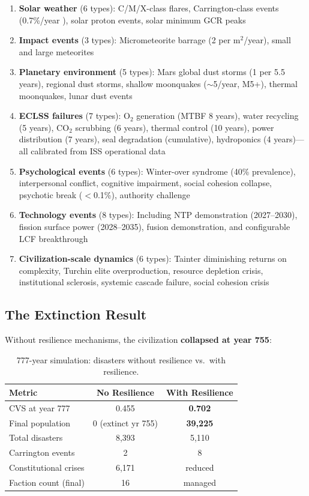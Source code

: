 \documentclass[12pt,a4paper]{article}
\begin{document}
\begin{enumerate}
    \item \textbf{Solar weather} (6 types): C/M/X-class flares, Carrington-class events (0.7\%/year \citep{riley2012probability}), solar proton events, solar minimum GCR peaks
    \item \textbf{Impact events} (3 types): Micrometeorite barrage (2 per m$^2$/year), small and large meteorites
    \item \textbf{Planetary environment} (5 types): Mars global dust storms (1 per 5.5 years), regional dust storms, shallow moonquakes ($\sim$5/year, M5+), thermal moonquakes, lunar dust events
    \item \textbf{ECLSS failures} (7 types): O$_2$ generation (MTBF 8 years), water recycling (5 years), CO$_2$ scrubbing (6 years), thermal control (10 years), power distribution (7 years), seal degradation (cumulative), hydroponics (4 years)---all calibrated from ISS operational data
    \item \textbf{Psychological events} (6 types): Winter-over syndrome (40\% prevalence), interpersonal conflict, cognitive impairment, social cohesion collapse, psychotic break ($<$0.1\%), authority challenge
    \item \textbf{Technology events} (8 types): Including NTP demonstration (2027--2030), fission surface power (2028--2035), fusion demonstration, and configurable LCF breakthrough
    \item \textbf{Civilization-scale dynamics} (6 types): Tainter diminishing returns on complexity, Turchin elite overproduction, resource depletion crisis, institutional sclerosis, systemic cascade failure, social cohesion crisis
\end{enumerate}

\subsection{The Extinction Result}

Without resilience mechanisms, the civilization \textbf{collapsed at year 755}:

\begin{table}[h]
\centering
\caption{777-year simulation: disasters without resilience vs.\ with resilience.}
\label{tab:disasters}
\begin{tabular}{@{}lcc@{}}
\toprule
\textbf{Metric} & \textbf{No Resilience} & \textbf{With Resilience} \\
\midrule
CVS at year 777      & 0.455               & \textbf{0.702} \\
Final population     & 0 (extinct yr 755)  & \textbf{39,225} \\
Total disasters      & 8,393               & 5,110 \\
Carrington events    & 2                   & 8 \\
Constitutional crises & 6,171              & reduced \\
Faction count (final) & 16                 & managed \\
\bottomrule
\end{tabular}
\end{table}
\end{document}
